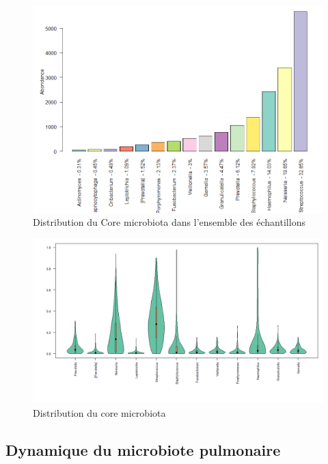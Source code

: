 \documentclass[12pt,a4paper]{article}
\begin{document}
\begin{figure}[t]
\begin{center}
\includegraphics[scale=0.5]{img/core.png}\hfill
\end{center}
\caption{Distribution du Core microbiota dans l'ensemble des échantillons}
\label{core}
\end{figure}



\begin{figure}[t]
\begin{center}
\includegraphics[scale=0.5]{img/variability.png}\hfill
\end{center}
\caption{Distribution du core microbiota}
\label{violon}
\end{figure}



\subsection{Dynamique du microbiote pulmonaire}
\end{document}
